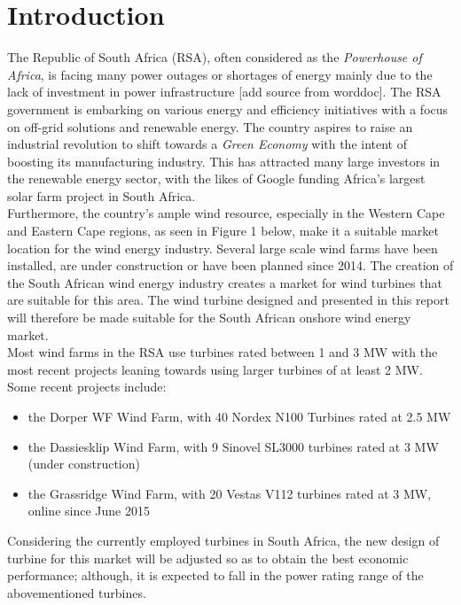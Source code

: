 \section{Introduction}

The Republic of South Africa (RSA), often considered as the \textit{Powerhouse of Africa}, is facing many power outages or shortages of energy mainly due to the lack of investment in power infrastructure [add source from worddoc]. The RSA government is embarking on various energy and efficiency initiatives with a focus on off-grid solutions and renewable energy. The country aspires to raise an industrial revolution to shift towards a \textit{Green Economy} with the intent of boosting its manufacturing industry. This has attracted many large investors in the renewable energy sector, with the likes of Google funding Africa’s largest solar farm project in South Africa.
\vspace{5mm}\\
Furthermore, the country’s ample wind resource, especially in the Western Cape and Eastern Cape regions, as seen in Figure 1 below, make it a suitable market location for the wind energy industry. Several large scale wind farms have been installed, are under construction or have been planned since 2014. The creation of the South African wind energy industry creates a market for wind turbines that are suitable for this area. The wind turbine designed and presented in this report will therefore be made suitable for the South African onshore wind energy market.
\vspace{5mm}\\
Most wind farms in the RSA use turbines rated between 1 and 3 MW with the most recent projects leaning towards using larger turbines of at least 2 MW. Some recent projects include:
\begin{itemize}
    \item the Dorper WF Wind Farm, with 40 Nordex N100 Turbines rated at 2.5 MW
    \item the Dassiesklip Wind Farm, with 9 Sinovel SL3000 turbines rated at 3 MW (under construction)
    \item the Grassridge Wind Farm, with 20 Vestas V112 turbines rated at 3 MW, online since June 2015
\end{itemize}
 Considering the currently employed turbines in South Africa, the new design of turbine for this market will be adjusted so as to obtain the best economic performance; although, it is expected to fall in the power rating range of the abovementioned turbines.\\
